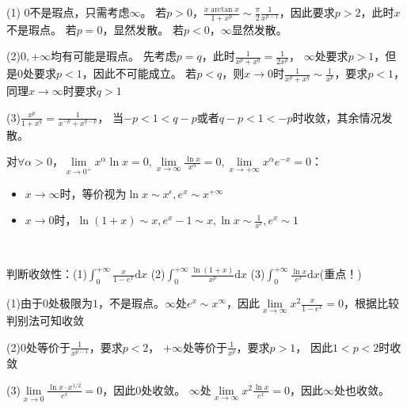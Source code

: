 \begin{solution}
  (1)
  $0$不是瑕点，只需考虑$\infty$。
  若$p > 0$，$\frac{x \arctan x}{1 + x^p} \sim \frac{\pi}{2}\frac{1}{x^{p-1}}$，因此要求$p > 2$，此时$x$不是瑕点。
  若$p = 0$，显然发散。
  若$p < 0$，$\infty$显然发散。

  (2)$0,+\infty$均有可能是瑕点。
  先考虑$p = q$，此时$\frac{1}{x^p+x^q} = \frac{1}{2x^p}$，
  $\infty$处要求$p > 1$，但是$0$处要求$p < 1$，因此不可能成立。
  若$p < q$，则$x \rightarrow 0$时$\frac{1}{x^p + x^q} \sim \frac{1}{x^p}$，要求$p < 1$，
  同理$x \rightarrow \infty$时要求$q > 1$

  (3)$\frac{x^p}{1 + x^q} = \frac{1}{x^{-p} + x^{q - p}}$，
  当$-p < 1 < q - p$或者$q-p < 1 < -p$时收敛，其余情况发散。
\end{solution}

\begin{corollary}[对数、指数比较判别法]
  对$\forall \alpha > 0$，$\lim \limits _{x \rightarrow 0^+}x^{\alpha}\ln x= 0, \lim \limits _{x \rightarrow \infty} \frac{\ln x}{x^{\alpha}} = 0, \lim \limits _{x \rightarrow +\infty}x^{\alpha}e^{-x} = 0$：
  \begin{itemize}
  \item $x \rightarrow \infty$时，等价视为$\ln x \sim x^{\epsilon}, e^x \sim x^{+\infty}$
  \item $x \rightarrow 0$时，$\ln (1+x) \sim x, e^x - 1 \sim x, \ln x \sim \frac{1}{x^{\epsilon}}, e^x \sim 1$
  \end{itemize}
\end{corollary}

~

\begin{exercise}[对数、指数比较判别训练]
  判断收敛性：(1)$\int_0^{+\infty}\frac{x}{1 - e^x}\mathrm{d}x$
  (2)$\int_0^{+\infty}\frac{\ln(1 + x)}{x^p}\mathrm{d}x$
  (3)$\int_0^{+\infty}\frac{\ln x}{e^x}\mathrm{d}x$(重点！)
\end{exercise}

\begin{solution}
  (1)由于$0$处极限为$1$，不是瑕点。$\infty$处$e^x \sim x^{\infty}$，因此$\lim \limits _{x \rightarrow \infty}x^2 \frac{x}{1 - e^x} = 0$，根据比较判别法可知收敛

  (2)$0$处等价于$\frac{1}{x^{p-1}}$，要求$p < 2$，
  $+\infty$处等价于$\frac{1}{x^p}$，要求$p > 1$，
  因此$1 < p < 2$时收敛

  (3)$\lim \limits _{x \rightarrow 0}\frac{\ln x \cdot x^{1/2}}{e^x} = 0$，因此$0$处收敛。
  $\infty$处$\lim \limits _{x \rightarrow \infty}x^2 \frac{\ln x}{e^x} = 0$，因此$\infty$处也收敛。
\end{solution}

